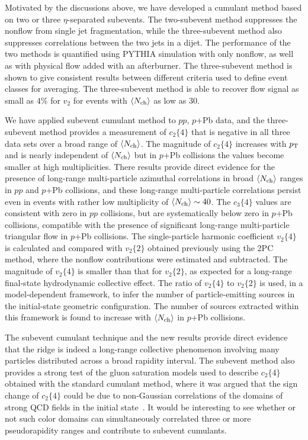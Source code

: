 Motivated by the discussions above, we have developed a cumulant method based on two or three $\eta$-separated subevents. The two-subevent method suppresses the nonflow from single jet fragmentation, while the three-subevent method also suppresses correlations between the two jets in a dijet. The performance of the two methods is quantified using PYTHIA simulation with only nonflow, as well as with physical flow added with an afterburner. The three-subevent method is shown to give consistent results between different criteria used to define event classes for averaging. The three-subevent method is able to recover flow signal as small as $4\%$ for $v_2$ for events with $\left\langle N_\text{ch}\right\rangle$  as low as 30.

We have applied subevent cumulant method to $pp$, $p$+Pb data, and the three-subevent method provides a measurement of $c_2\{4\}$ that is negative in all three data sets over a broad range of $\left\langle N_\text{ch}\right\rangle$. The magnitude of $c_2\{4\}$ increases with $p_\text{T}$ and is nearly independent of $\left\langle N_\text{ch}\right\rangle$ but in $p$+Pb collisions the values become smaller at high multiplicities. There results provide direct evidence for the presence of long-range multi-particle azimuthal correlations in broad $\left\langle N_\text{ch}\right\rangle$ ranges in $pp$ and $p$+Pb collisions, and these long-range multi-particle correlations persist even in events with rather low multiplicity of $\left\langle N_\text{ch}\right\rangle\sim 40$. The $c_3\{4\}$ values are consistent with zero in $pp$ collisions, but are systematically below zero in $p$+Pb collisions, compatible with the presence of significant long-range multi-particle triangular flow in $p$+Pb collisions. The single-particle harmonic coefficient $v_2\{4\}$ is calculated and compared with $v_2\{2\}$ obtained previously using the 2PC method, where the nonflow contributions were estimated and subtracted. The magnitude of $v_2\{4\}$ is smaller than that for $v_2\{2\}$, as expected for a long-range final-state hydrodynamic collective effect. The ratio of $v_2\{4\}$ to $v_2\{2\}$ is used, in a model-dependent framework, to infer the number of particle-emitting sources in the initial-state geometric configuration. The number of sources extracted within this framework is found to increase with $\left\langle N_\text{ch}\right\rangle$ in $p$+Pb collisions.

The subevent cumulant technique and the new results provide direct evidence that the ridge is indeed a long-range collective phenomenon involving many particles distributed across a broad rapidity interval. The subevent method also provides a strong test of the gluon saturation models used to describe $c_2\{4\}$ obtained with the standard cumulant method, where it was argued that the sign change of $c_2\{4\}$ could be due to non-Gaussian correlations of the domains of strong QCD fields in the initial state~\cite{Dumitru:2014yza, Lappi:2015vta}. It would be interesting to see whether or not such color domains can simultaneously correlated three or more pseudorapidity ranges and contribute to subevent cumulants.



